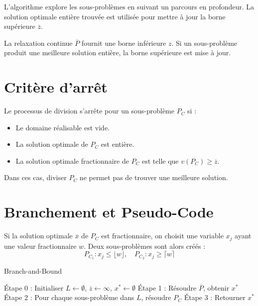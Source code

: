 \documentclass{report}
\begin{document}
\begin{multicols*}{2}
L'algorithme explore les sous-problèmes en suivant un parcours en profondeur. La 
solution optimale entière trouvée est utilisée pour mettre à jour la borne 
supérieure \( \overline{z} \).

La relaxation continue \( \overline{P} \) fournit une borne inférieure \( z \). Si un 
sous-problème produit une meilleure solution entière, la borne supérieure est 
mise à jour.

\section{Critère d'arrêt}

Le processus de division s'arrête pour un sous-problème \( P_C \) si :
\begin{itemize}
    \item Le domaine réalisable est vide.
    \item La solution optimale de \( P_C \) est entière.
    \item La solution optimale fractionnaire de \( P_C \) est telle que 
    \( v(P_C) \geq \overline{z} \).
\end{itemize}

Dans ces cas, diviser \( P_C \) ne permet pas de trouver une meilleure solution.

\section{Branchement et Pseudo-Code}

Si la solution optimale \( \overline{x} \) de \( P_C \) est fractionnaire, on choisit 
une variable \( x_j \) ayant une valeur fractionnaire \( w \). Deux sous-problèmes 
sont alors créés :
\[
P_{C_1} : x_j \leq \lfloor w \rfloor, \quad P_{C_2} : x_j \geq \lceil w \rceil
\]





\begin{algorithm}[H]
\caption{Branch-and-Bound}
\SetAlgoLined
Étape 0 : Initialiser \( L \leftarrow \emptyset \), \( \overline{z} \leftarrow \infty \),
\( x^* \leftarrow \emptyset \)\;
Étape 1 : Résoudre \( \overline{P} \), obtenir \( x^* \)\;
Étape 2 : Pour chaque sous-problème dans \( L \), résoudre \( P_C \)\;
Étape 3 : Retourner \( x^* \)\;
\end{algorithm}



\end{multicols*}
\end{document}
